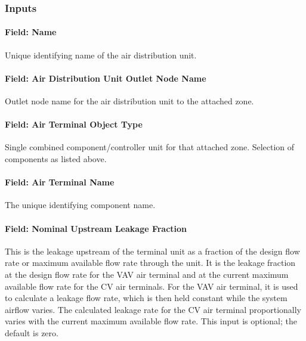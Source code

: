 \subsubsection{Inputs}\label{inputs-055}

\paragraph{Field: Name}\label{field-name-053}

Unique identifying name of the air distribution unit.

\paragraph{Field: Air Distribution Unit Outlet Node Name}\label{field-air-distribution-unit-outlet-node-name}

Outlet node name for the air distribution unit to the attached zone.

\paragraph{Field: Air Terminal Object Type}\label{field-air-terminal-object-type}

Single combined component/controller unit for that attached zone. Selection of components as listed above.

\paragraph{Field: Air Terminal Name}\label{field-air-terminal-name}

The unique identifying component name.

\paragraph{Field: Nominal Upstream Leakage Fraction}\label{field-nominal-upstream-leakage-fraction}

This is the leakage upstream of the terminal unit as a fraction of the design flow rate or maximum available flow rate through the unit. It is the leakage fraction at the design flow rate for the VAV air terminal and at the current maximum available flow rate for the CV air terminals. For the VAV air terminal, it is used to calculate a leakage flow rate, which is then held constant while the system airflow varies. The calculated leakage rate for the CV air terminal proportionally varies with the current maximum available flow rate. This input is optional; the default is zero.

